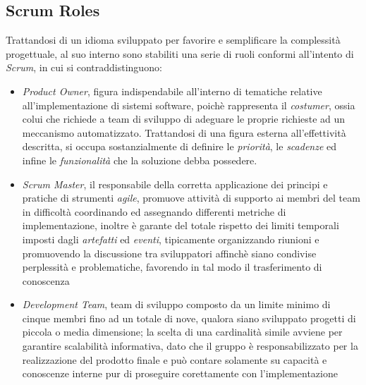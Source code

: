 \documentclass{article}
\begin{document}
\subsection*{Scrum Roles}
\large
Trattandosi di un idioma sviluppato per favorire e semplificare la complessità progettuale, al suo interno sono stabiliti una serie di ruoli conformi all'intento di \textit{Scrum}, in cui si contraddistinguono:
\begin{itemize}[label={-}]
    \itemsep0em
    \item \textit{Product Owner}, figura indispendabile all'interno di tematiche relative all'implementazione di sistemi software, poichè rappresenta il \textit{costumer}, ossia colui che richiede a team di sviluppo di adeguare le proprie richieste ad un meccanismo automatizzato. Trattandosi di una figura esterna all'effettività descritta, si occupa sostanzialmente di definire le \textit{priorità}, le \textit{scadenze} ed infine le \textit{funzionalità} che la soluzione debba possedere. 
    \item \textit{Scrum Master}, il responsabile della corretta applicazione dei principi e pratiche di strumenti \textit{agile}, promuove attività di supporto ai membri del team in difficoltà coordinando ed assegnando differenti metriche di implementazione, inoltre è garante del totale rispetto dei limiti temporali imposti dagli \textit{artefatti} ed \textit{eventi}, tipicamente organizzando riunioni e promuovendo la discussione tra sviluppatori affinchè siano condivise perplessità e problematiche, favorendo in tal modo il trasferimento di conoscenza
    \item \textit{Development Team}, team di sviluppo composto da un limite minimo di cinque membri fino ad un totale di nove, qualora siano sviluppato progetti di piccola o media dimensione; la scelta di una cardinalità simile avviene per garantire scalabilità informativa, dato che il gruppo è responsabilizzato per la realizzazione del prodotto finale e può contare solamente su capacità e conoscenze interne pur di proseguire corettamente con l'implementazione
\end{itemize}
\end{document}
